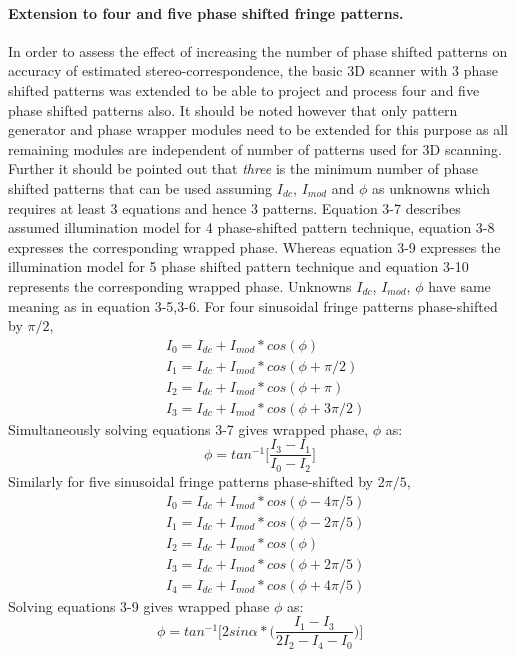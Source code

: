 \paragraph{Extension to four and five phase shifted fringe patterns.}
In order to assess the effect of increasing the number of phase shifted patterns on accuracy of estimated stereo-correspondence,  the basic 3D scanner with 3 phase shifted patterns was extended to be able to project and process four and five phase shifted patterns also. It should be noted however that only pattern generator and phase wrapper modules need to be extended for this purpose as all remaining modules are independent of number of patterns used for 3D scanning. Further it should be pointed out that \textit{three} is the minimum number of phase shifted patterns that can be used assuming $I_{dc}$, $I_{mod}$ and $\phi$ as unknowns which requires at least 3 equations and hence 3 patterns. Equation 3-7 describes assumed illumination model for 4 phase-shifted pattern technique,  equation 3-8 expresses the corresponding wrapped phase. Whereas equation 3-9 expresses the illumination model for 5 phase shifted pattern technique and equation 3-10 represents the corresponding wrapped phase. Unknowns $I_{dc}$, $I_{mod}$, $\phi$ have same meaning as in equation 3-5,3-6.\newline
\noindent
For four sinusoidal fringe patterns phase-shifted by $\pi/2$,
\begin{equation}
\begin{aligned}
& I_0=I_{dc}+I_{mod}*cos(\phi) \\
& I_1=I_{dc}+I_{mod}*cos(\phi+\pi/2) \\
& I_2=I_{dc}+I_{mod}*cos(\phi+\pi) \\
& I_3=I_{dc}+I_{mod}*cos(\phi+3\pi/2)
\end{aligned}
\end{equation}
Simultaneously solving equations 3-7 gives wrapped phase, $\phi$ as:
\begin{equation}
\phi=tan^{-1}\bigg[\frac{I_3-I_1}{I_0-I_2}\bigg]
\end{equation}
Similarly for five sinusoidal fringe patterns phase-shifted by $2\pi/5$,
\begin{equation}
\begin{aligned}
& I_0=I_{dc}+I_{mod}*cos(\phi-4\pi/5) \\
& I_1=I_{dc}+I_{mod}*cos(\phi-2\pi/5) \\
& I_2=I_{dc}+I_{mod}*cos(\phi) \\
& I_3=I_{dc}+I_{mod}*cos(\phi+2\pi/5)\\
& I_4=I_{dc}+I_{mod}*cos(\phi+4\pi/5)
\end{aligned}
\end{equation}
Solving equations 3-9 gives wrapped phase $\phi$ as: 
\begin{equation}
\phi=tan^{-1}\bigg[2sin\alpha*\bigg(\frac{I_1-I_3}{2I_2-I_4-I_0}\bigg)\bigg]
\end{equation}


